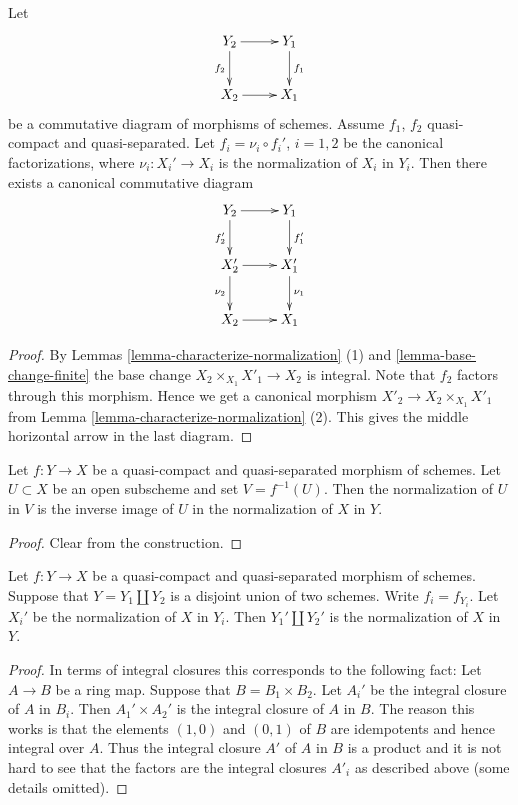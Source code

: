 \begin{lemma}
\label{lemma-functoriality-normalization}
Let
$$
\xymatrix{
Y_2 \ar[d]_{f_2} \ar[r] & Y_1 \ar[d]^{f_1} \\
X_2 \ar[r] & X_1
}
$$
be a commutative diagram of morphisms of schemes.
Assume $f_1$, $f_2$ quasi-compact and quasi-separated.
Let $f_i = \nu_i \circ f_i'$, $i = 1, 2$
be the canonical factorizations, where $\nu_i : X_i' \to X_i$ is
the normalization of $X_i$ in $Y_i$. Then there exists a
canonical commutative diagram
$$
\xymatrix{
Y_2 \ar[d]_{f_2'} \ar[r] & Y_1 \ar[d]^{f_1'} \\
X_2' \ar[d]_{\nu_2} \ar[r] & X_1' \ar[d]^{\nu_1} \\
X_2 \ar[r] & X_1
}
$$
\end{lemma}

\begin{proof}
By Lemmas \ref{lemma-characterize-normalization} (1)
and \ref{lemma-base-change-finite}
the base change $X_2 \times_{X_1} X'_1 \to X_2$
is integral. Note that $f_2$ factors through this morphism.
Hence we get a canonical morphism
$X'_2 \to X_2 \times_{X_1} X'_1$ from
Lemma \ref{lemma-characterize-normalization} (2).
This gives the middle horizontal arrow in the last diagram.
\end{proof}

\begin{lemma}
\label{lemma-normalization-localization}
Let $f : Y \to X$ be a quasi-compact and quasi-separated morphism of schemes.
Let $U \subset X$ be an open subscheme and set $V = f^{-1}(U)$.
Then the normalization of $U$ in $V$ is the inverse image of $U$
in the normalization of $X$ in $Y$.
\end{lemma}

\begin{proof}
Clear from the construction.
\end{proof}

\begin{lemma}
\label{lemma-normalization-in-disjoint-union}
Let $f : Y \to X$ be a quasi-compact and quasi-separated morphism of schemes.
Suppose that $Y = Y_1 \coprod Y_2$ is a disjoint union of two schemes.
Write $f_i = f_{Y_i}$. Let $X_i'$ be the normalization of $X$ in $Y_i$.
Then $Y_1' \coprod Y_2'$ is the normalization of $X$ in $Y$.
\end{lemma}

\begin{proof}
In terms of integral closures this corresponds to the following fact:
Let $A \to B$ be a ring map. Suppose that $B = B_1 \times B_2$.
Let $A_i'$ be the integral closure of $A$ in $B_i$. Then
$A_1' \times A_2'$ is the integral closure of $A$ in $B$.
The reason this works is that the elements $(1, 0)$ and $(0, 1)$ of $B$
are idempotents and hence integral over $A$. Thus the integral closure
$A'$ of $A$ in $B$ is a product and it is not hard to see that the factors
are the integral closures $A'_i$ as described above (some details
omitted).
\end{proof}

